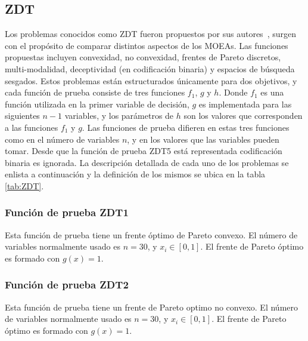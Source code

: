 \subsection{ZDT}
Los problemas conocidos como ZDT fueron propuestos por sus autores~\cite{Joel:ZDT}, surgen con el propósito de comparar distintos aspectos de los MOEAs.
%
Las funciones propuestas incluyen convexidad, no convexidad, frentes de Pareto discretos, multi-modalidad, deceptividad (en codificación binaria) y espacios de búsqueda sesgados.
%
Estos problemas están estructurados únicamente para dos objetivos, y cada función de prueba consiste de tres funciones $f_1$, $g$ y $h$.
%
Donde $f_1$ es una función utilizada en la primer variable de decisión, $g$ es implementada para las siguientes $n-1$ variables, y los parámetros de $h$ son los valores que corresponden a las funciones $f_1$ y $g$.
%
Las funciones de prueba difieren en estas tres funciones como en el número de variables $n$, y en los valores que las variables pueden tomar.
%
Desde que la función de prueba ZDT5 está representada codificación binaria es ignorada.
%
La descripción detallada de cada uno de los problemas se enlista a continuación y la definición de los mismos se ubica en la tabla \ref{tab:ZDT}.

\subsubsection*{Función de prueba ZDT1}
Esta función de prueba tiene un frente óptimo de Pareto convexo.
El número de variables normalmente usado es $n=30$, y $x_i \in [0,1]$. El frente de Pareto óptimo es formado con $g(x)=1$.

\subsubsection*{Función de prueba ZDT2}
Esta función de prueba tiene un frente de Pareto optimo no convexo.
El número de variables normalmente usado es $n=30$, y $x_i \in [0,1]$. El frente de Pareto óptimo es formado con $g(x)=1$.

